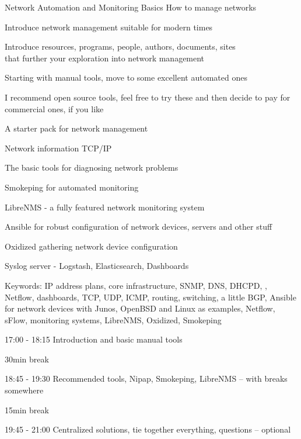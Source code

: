 \documentclass[Screen16to9,17pt]{foils}
\begin{document}
\mytitlepage
{Network Automation and Monitoring Basics}
{How to manage networks}

\hlkprofiluk




\begin{list2}
\item Introduce network management suitable for modern times
\item Introduce resources, programs, people, authors, documents, sites\\
 that further your exploration into network management
\item Starting with manual tools, move to some excellent automated ones
\item I recommend open source tools, feel free to try these and then decide to pay for commercial ones, if you like
\end{list2}




A starter pack for network management

\begin{list2}
\item Network information TCP/IP
\item The basic tools for diagnosing network problems
\item Smokeping for automated monitoring
\item LibreNMS - a fully featured network monitoring system
\item Ansible for robust configuration of network devices, servers and other stuff
\item Oxidized gathering network device configuration
\item Syslog server - Logstash, Elasticsearch, Dashboards
\end{list2}

Keywords:
IP address plans, core infrastructure, SNMP, DNS, DHCPD, , Netflow, dashboards, TCP, UDP, ICMP, routing, switching, a little BGP, Ansible for network devices with Junos, OpenBSD and Linux as examples, Netflow, sFlow, monitoring systems, LibreNMS, Oxidized, Smokeping



\begin{list2}
\item 17:00 - 18:15 Introduction and basic manual tools
\item 30min break
\item 18:45 - 19:30 Recommended tools, Nipap, Smokeping, LibreNMS -- with breaks somewhere
\item 15min break
\item 19:45 - 21:00  Centralized solutions, tie together everything, questions -- optional
\end{list2}
\end{document}
